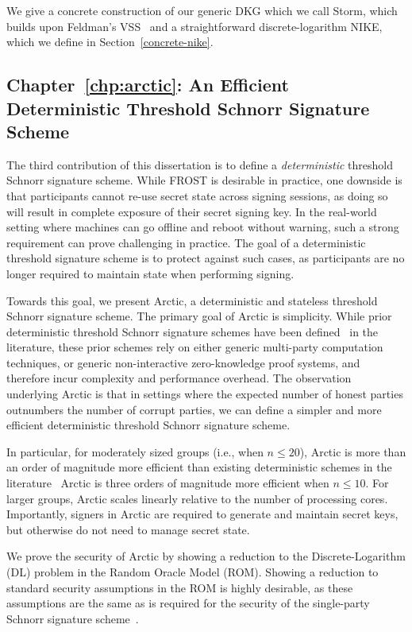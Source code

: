 We give a concrete construction of our generic DKG which we call Storm,
which builds upon Feldman's VSS~\cite{Feldman87}  and a straightforward discrete-logarithm NIKE,
which we define in Section~\ref{concrete-nike}.

\subsection{Chapter~\ref{chp:arctic}: An Efficient Deterministic Threshold Schnorr Signature Scheme}

The third contribution of this dissertation is to define a \emph{deterministic} threshold Schnorr signature scheme.
While FROST is desirable in practice,
one downside is that participants cannot re-use secret state across signing sessions,
as doing so will result in complete exposure of their secret signing key.
In the real-world setting where machines can go offline and reboot without warning,
such a strong requirement can prove challenging in practice.
The goal of a deterministic threshold signature scheme is to protect against such cases,
as participants are no longer required to maintain state when performing signing.

Towards this goal, we present Arctic,
a deterministic and stateless threshold Schnorr signature scheme.
The primary goal of Arctic is simplicity.
While prior deterministic threshold Schnorr signature schemes have been defined~\cite{NickRSW20,GarillotKMN21,KondiOR23} in the literature,
these prior schemes rely on either generic multi-party computation techniques,
or generic non-interactive zero-knowledge proof systems,
and therefore incur complexity and performance overhead.
The observation underlying Arctic is that in settings where the expected number of honest parties outnumbers the number of corrupt parties,
we can define a simpler and more efficient deterministic threshold Schnorr signature scheme.

In particular,
for moderately sized groups (i.e., when $n \leq 20$),
Arctic is more than an order of magnitude more efficient than existing deterministic schemes in the literature~\cite{NickRSW20,GarillotKMN21,KondiOR23}
Arctic is three orders of magnitude more efficient when $n \leq 10$.
For larger groups,
Arctic scales linearly relative to the number of processing cores.
Importantly,
signers in Arctic are required to generate and maintain secret keys,
but otherwise do not need to manage secret state.

We prove the security of Arctic by showing a reduction to the Discrete-Logarithm (DL) problem in the Random Oracle Model (ROM).
Showing a reduction to standard security assumptions in the ROM is highly desirable,
as these assumptions are the same as is required for the security of the single-party Schnorr signature scheme~\cite{Schnorr91}.

